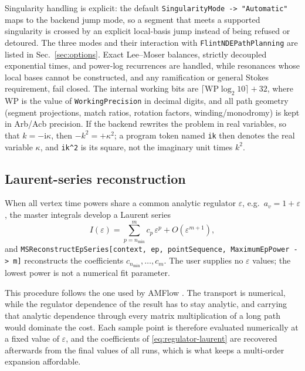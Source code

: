 \documentclass[11pt,a4paper]{article}
\numberwithin{table}{section}
\newcommand{\ii}{\mathrm i}
\begin{document}
Singularity handling is explicit: the default \texttt{SingularityMode -> "Automatic"} maps to the
backend jump mode, so a segment that meets a supported singularity is crossed by an explicit
local-basis jump instead of being refused or detoured. The three modes and their interaction with
\texttt{FlintNDEPathPlanning} are listed in Sec.~\ref{sec:options}. Exact Lee--Moser balances,
strictly decoupled exponential times, and power-log recurrences are handled, while resonances
whose local bases cannot be constructed, and any ramification or general Stokes requirement, fail
closed. The internal working bits are $\lceil\mathrm{WP}\log_2 10\rceil+32$, where WP is the value of
\texttt{WorkingPrecision} in decimal digits, and all path geometry (segment
projections, match ratios, rotation factors, winding/monodromy) is kept in Arb/Acb precision.
If the backend rewrites the problem in real variables, so that $k=-\ii\kappa$, then $-k^2=+\kappa^2$;
a program token named \texttt{ik} then denotes the real variable $\kappa$, and \texttt{ik\^{}2} is its
square, not the imaginary unit times $k^2$.

\subsection{Laurent-series reconstruction}
\label{sec:regulator}

When all vertex time powers share a common analytic regulator $\varepsilon$, e.g.\
$a_v=1+\varepsilon$, the master integrals develop a Laurent series
\begin{equation}
  I(\varepsilon)=\sum_{p=n_{\min}}^{m}c_p\,\varepsilon^p
  +O(\varepsilon^{m+1}),
  \label{eq:regulator-laurent}
\end{equation}
and \texttt{MSReconstructEpSeries[context, ep, pointSequence, MaximumEpPower -> m]}
reconstructs the coefficients $c_{n_{\min}},\ldots,c_m$. The user supplies no
$\varepsilon$ values; the lowest power is not a numerical fit parameter.

This procedure follows the one used by AMFlow \cite{Liu:2022chg,Huang:2026rjb}. The transport
is numerical, while the regulator dependence of the result has to stay analytic, and carrying that
analytic dependence through every matrix multiplication of a long path would dominate the cost.
Each sample point is therefore evaluated numerically at a fixed value of $\varepsilon$, and the
coefficients of \eqref{eq:regulator-laurent} are recovered afterwards from the final values of all
runs, which is what keeps a multi-order expansion affordable.
\end{document}
